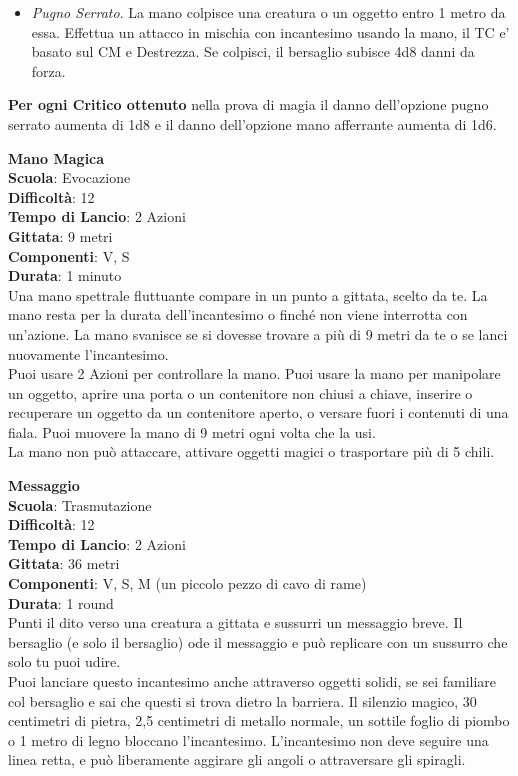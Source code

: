 \begin{multicols}{2}
\begin{itemize}
\item
\textit{Pugno Serrato}. La mano colpisce una creatura o un oggetto entro 1 metro da essa. Effettua un attacco in mischia con incantesimo usando la mano, il TC e' basato sul CM e Destrezza. Se colpisci, il bersaglio subisce 4d8 danni da forza.
\end{itemize}
\medskip
\textbf{Per ogni Critico ottenuto} nella prova di magia il danno dell'opzione pugno serrato aumenta di 1d8 e il danno dell'opzione mano afferrante aumenta di 1d6.

\medskip\textbf{Mano Magica}\\
\textbf{Scuola}: Evocazione\\
\textbf{Difficoltà}: 12\\
\textbf{Tempo di Lancio}: 2 Azioni\\
\textbf{Gittata}: 9 metri\\
\textbf{Componenti}: V, S\\
\textbf{Durata}: 1 minuto\\
Una mano spettrale fluttuante compare in un punto a gittata, scelto da te. La mano resta per la durata dell'incantesimo o finché non viene interrotta con un'azione. La mano svanisce se si dovesse trovare a più di 9 metri da te o se lanci nuovamente l'incantesimo.\\
Puoi usare 2 Azioni per controllare la mano. Puoi usare la mano per manipolare un oggetto, aprire una porta o un contenitore non chiusi a chiave, inserire o recuperare un oggetto da un contenitore aperto, o versare fuori i contenuti di una fiala. Puoi muovere la mano di 9 metri ogni volta che la usi.\\
La mano non può attaccare, attivare oggetti magici o trasportare più di 5 chili.

\medskip\textbf{Messaggio}\\
\textbf{Scuola}: Trasmutazione\\
\textbf{Difficoltà}: 12\\
\textbf{Tempo di Lancio}: 2 Azioni\\
\textbf{Gittata}: 36 metri\\
\textbf{Componenti}: V, S, M (un piccolo pezzo di cavo di rame)\\
\textbf{Durata}: 1 round\\
Punti il dito verso una creatura a gittata e sussurri un messaggio breve. Il bersaglio (e solo il bersaglio) ode il messaggio e può replicare con un sussurro che solo tu puoi udire.\\
Puoi lanciare questo incantesimo anche attraverso oggetti solidi, se sei familiare col bersaglio e sai che questi si trova dietro la barriera. Il silenzio magico, 30 centimetri di pietra, 2,5 centimetri di metallo normale, un sottile foglio di piombo o 1 metro di legno bloccano l'incantesimo. L'incantesimo non deve seguire una linea retta, e può liberamente aggirare gli angoli o attraversare gli spiragli.


\end{multicols}
